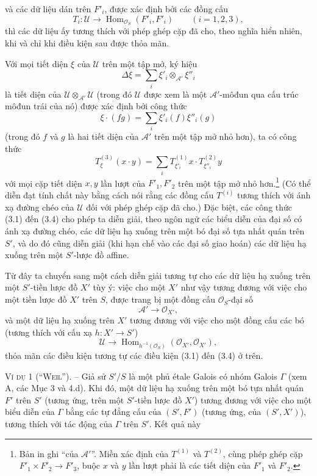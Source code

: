 và các dữ liệu dán trên $F'_i$, được xác định bởi các đồng cấu
\[
  T_i:\mathcal U\longrightarrow
  \operatorname{Hom}_{\mathcal O_S}(F'_i,F'_i)
  \qquad (i=1,2,3),
\]
thì các dữ liệu ấy tương thích với phép ghép cặp đã cho, theo nghĩa hiển nhiên,
khi và chỉ khi điều kiện sau được thỏa mãn.

Với mọi tiết diện $\xi$ của $\mathcal U$ trên một tập mở, ký hiệu
\[
  \Delta\xi=\sum_i\xi'_i\otimes_{\mathcal A'}\xi''_i
\]
là tiết diện của $\mathcal U\otimes_{\mathcal A'}\mathcal U$ (trong đó
$\mathcal U$ được xem là một $\mathcal A'$-môđun qua cấu trúc môđun trái của
nó) được xác định bởi công thức
\[
  \xi\mathbin{\cdot}(fg)=\sum_i\xi'_i(f)\xi''_i(g)
\]
(trong đó $f$ và $g$ là hai tiết diện của $\mathcal A'$ trên một tập mở nhỏ
hơn), ta có công thức
\begin{equation}
  T^{(3)}_\xi(x\mathbin{\cdot}y)
  =\sum_iT^{(1)}_{\xi'_i}x\mathbin{\cdot}T^{(2)}_{\xi''_i}y
  \tag{3.4}
\end{equation}
với mọi cặp tiết diện $x,y$ lần lượt của $F'_1,F'_2$ trên một tập mở nhỏ
hơn.\footnote{Bản in ghi ``của $\mathcal A'$''. Miền xác định của $T^{(1)}$ và
$T^{(2)}$, cùng phép ghép cặp
$F'_1\times F'_2\longrightarrow F'_3$, buộc $x$ và $y$ lần lượt phải là các
tiết diện của $F'_1$ và $F'_2$.} (Có thể diễn đạt tính chất này bằng cách nói
rằng các đồng cấu $T^{(i)}$ tương thích với ánh xạ đường chéo của $\mathcal U$
đối với phép ghép cặp đã cho.) Đặc biệt, các công thức (3.1) đến (3.4) cho phép
ta diễn giải, theo ngôn ngữ các biểu diễn của đại số có ánh xạ đường chéo, các
dữ liệu hạ xuống trên một bó đại số tựa nhất quán trên $S'$, và do đó cũng diễn
giải (khi hạn chế vào các đại số giao hoán) các dữ liệu hạ xuống trên một
$S'$-lược đồ affine.

Từ đây ta chuyển sang một cách diễn giải tương tự cho các dữ liệu hạ xuống trên
một $S'$-tiền lược đồ $X'$ tùy ý: việc cho một $X'$ như vậy tương đương với
việc cho một tiền lược đồ $X'$ trên $S$, được trang bị một đồng cấu
$\mathcal O_S$-đại số
\[
  \mathcal A'\longrightarrow\mathcal O_{X'},
\]
và một dữ liệu hạ xuống trên $X'$ tương đương với việc cho một đồng cấu các bó
(tương thích với cấu xạ $h:X'\longrightarrow S'$)
\[
  \mathcal U\longrightarrow
  \operatorname{Hom}_{h^{-1}(\mathcal O_S)}
  (\mathcal O_{X'},\mathcal O_{X'}),
\]
thỏa mãn các điều kiện tương tự các điều kiện (3.1) đến (3.4) ở trên.

\textsc{Ví dụ 1 (``Weil'').} -- Giả sử $S'/S$ là một phủ étale Galois có nhóm
Galois $\Gamma$ (xem A, các Mục 3 và 4.d). Khi đó, một dữ liệu hạ xuống trên một
bó tựa nhất quán $F'$ trên $S'$ (tương ứng, trên một $S'$-tiền lược đồ $X'$)
tương đương với việc cho một biểu diễn của $\Gamma$ bằng các tự đẳng cấu của
$(S',F')$ (tương ứng, của $(S',X')$), tương thích với tác động của $\Gamma$
trên $S'$. Kết quả này

